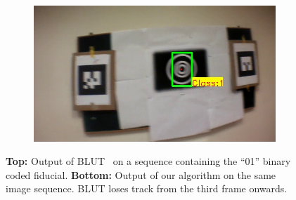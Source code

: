 \begin{figure}[ht!]
\begin{subfigure}[b]{.19\textwidth}
\end{subfigure}
\begin{subfigure}[b]{.19\textwidth}
\includegraphics[width=\linewidth]{figures/fiducial/BLUT_input_01/output15.jpg}
\end{subfigure}
\caption[Output of BLUT on ARTag and our fiducial with  code ``01'']{{\bf Top:}
Output of BLUT~\cite{Wu:2011} on a sequence containing the ``01'' binary coded fiducial. {\bf Bottom:} Output of our
algorithm on the same image 
sequence. BLUT loses  track from the third frame onwards.}
\label{fig:BLUT_compare_01}
\end{figure}

